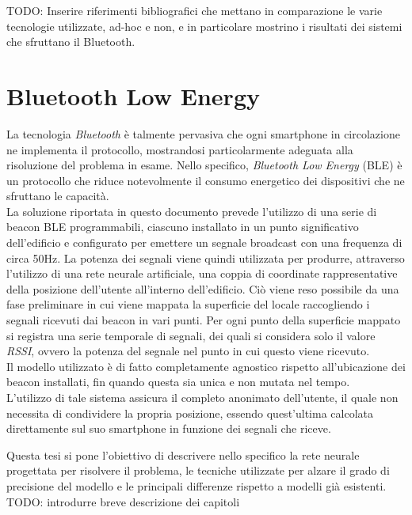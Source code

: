 \documentclass[draft]{standalone}
\begin{document}
{\large TODO: Inserire riferimenti bibliografici che mettano in comparazione le
  varie tecnologie utilizzate, ad-hoc e non, e in particolare mostrino i
  risultati dei sistemi che sfruttano il Bluetooth.}

\section{Bluetooth Low Energy}
La tecnologia \emph{Bluetooth} è talmente pervasiva che
ogni smartphone in circolazione ne implementa il protocollo, mostrandosi
particolarmente adeguata alla risoluzione del problema in esame. Nello
specifico, \emph{Bluetooth Low Energy} (BLE) è un protocollo che riduce
notevolmente il consumo energetico dei dispositivi che ne sfruttano le
capacità. \\
La soluzione riportata in questo documento prevede l'utilizzo di una serie di
beacon BLE programmabili, ciascuno installato in un punto significativo
dell'edificio e configurato per emettere un segnale broadcast con una frequenza
di circa 50Hz. La potenza dei segnali viene quindi utilizzata per produrre,
attraverso l'utilizzo di una rete neurale artificiale, una coppia di coordinate
rappresentative della posizione dell'utente all'interno dell'edificio. Ciò
viene reso possibile da una fase preliminare in cui viene mappata la superficie
del locale raccogliendo i segnali ricevuti dai beacon in vari punti. Per ogni
punto della superficie mappato si registra una serie temporale di segnali, dei
quali si considera solo il valore \emph{RSSI}, ovvero la potenza del segnale
nel punto in cui questo viene ricevuto. \\
Il modello utilizzato è di fatto completamente agnostico rispetto
all'ubicazione dei beacon installati, fin quando questa sia unica e non mutata
nel tempo. \\
L'utilizzo di tale sistema assicura il completo anonimato dell'utente, il quale
non necessita di condividere la propria posizione, essendo quest'ultima
calcolata direttamente sul suo smartphone in funzione dei segnali che riceve.

Questa tesi si pone l'obiettivo di descrivere nello specifico la rete neurale
progettata per risolvere il problema, le tecniche utilizzate per alzare il
grado di precisione del modello e le principali differenze rispetto a modelli
già esistenti. \\

{\large TODO: introdurre breve descrizione dei capitoli }
\end{document}
